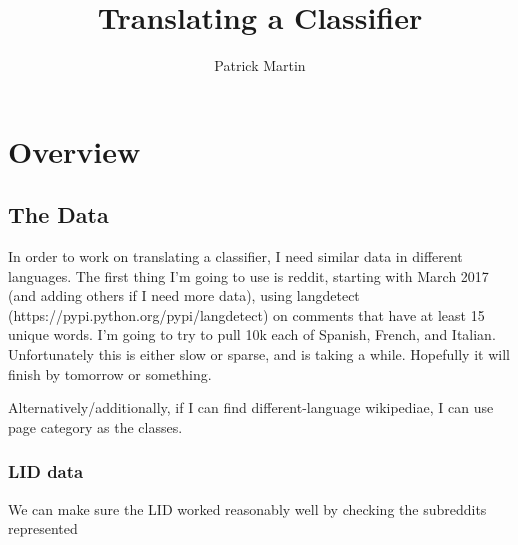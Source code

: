 \documentclass[11pt]{article} %
\title{Translating a Classifier}
\author{Patrick Martin}
\begin{document}
\maketitle

\section{Overview}



\subsection{The Data}

In order to work on translating a classifier, I need similar data in different languages. The first thing I'm going to use is reddit, starting with March 2017 (and adding others if I need more data), using langdetect (https://pypi.python.org/pypi/langdetect) on comments that have at least 15 unique words. I'm going to try to pull 10k each of Spanish, French, and Italian. Unfortunately this is either slow or sparse, and is taking a while. Hopefully it will finish by tomorrow or something.

Alternatively/additionally, if I can find different-language wikipediae, I can use page category as the classes.

\subsubsection{LID data}

We can make sure the LID worked reasonably well by checking the subreddits represented
\end{document}
